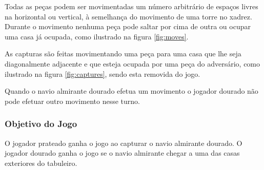 \documentclass[a4paper]{article}
\begin{document}
Todas as peças podem ser movimentadas um número arbitrário de espaços livres na horizontal ou vertical, à semelhança do movimento de uma torre no xadrez. Durante o movimento nenhuma peça pode saltar por cima de outra ou ocupar uma casa já ocupada, como ilustrado na figura \ref{fig:moves}.

As capturas são feitas movimentando uma peça para uma casa que lhe seja diagonalmente adjacente e que esteja ocupada por uma peça do adversário, como ilustrado na figura \ref{fig:captures}, sendo esta removida do jogo.

Quando o navio almirante dourado efetua um movimento o jogador dourado não pode efetuar outro movimento nesse turno.

\subsubsection{Objetivo do Jogo}
O jogador prateado ganha o jogo ao capturar o navio almirante dourado. O jogador dourado ganha o jogo se o navio almirante chegar a uma das casas exteriores do tabuleiro.
\end{document}
